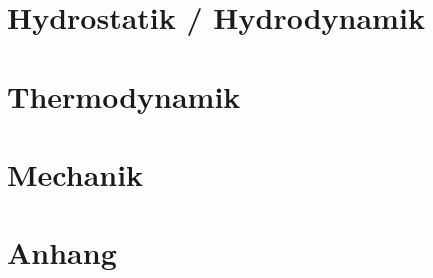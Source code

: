 \documentclass[8pt, a4paper, twoside]{extarticle}
\begin{document}
    \begin{layout}
		\part{Hydrostatik / Hydrodynamik}
        
		
		
		\part{Thermodynamik}
		
		
		
		
		
		
		
		
		\part{Mechanik}
		
		\part{Anhang}
		
    \end{layout}
 
\end{document}
